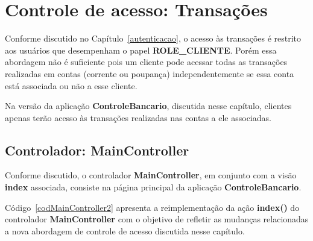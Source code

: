 \newpage

\section{Controle de acesso: Transações}

\vspace{0.5cm}

Conforme  discutido no  Capítulo~\ref{autenticacao},  o acesso  às transações  é
restrito aos  usuários que desempenham  o papel {\bf ROLE\_CLIENTE}.  Porém essa
abordagem  não é suficiente  pois um  cliente pode  acessar todas  as transações
realizadas em contas (corrente ou poupança) independentemente se essa conta está
associada ou não a esse cliente.

Na  versão  da  aplicação  {\bf  ControleBancario},  discutida  nesse  capítulo,
clientes  apenas  terão  acesso  às  transações  realizadas  nas  contas  a  ele
associadas.  

\subsection{Controlador: MainController}

\vspace{0.5cm}

Conforme discutido, o controlador {\bf  MainController}, em conjunto com a visão
{\bf  index}   associada,  consiste  na  página  principal   da  aplicação  {\bf
  ControleBancario}. 

Código~\ref{codMainController2}  apresenta   a  reimplementação  da   ação  {\bf
  index()} do  controlador {\bf  MainController} com o  objetivo de  refletir as
mudanças relacionadas  a nova  abordagem de controle  de acesso  discutida nesse
capítulo. 

